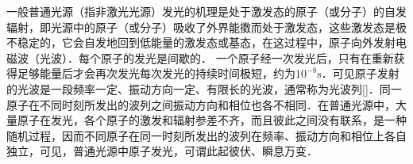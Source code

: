 
一般普通光源（指非激光光源）发光的机理是处于激发态的原子（或分子）的自发辐射，即光源中的原子（或分子）吸收了外界能擞而处于激发态，这些激发态是极不稳定的，它会自发地回到低能量的激发态或基态，在这过程中，原子向外发射电磁波（光波）．每个原子的发光是间歇的． 一个原子经一次发光后，只有在重新获得足够能量后才会再次发光每次发光的持续时间极短，约为$10^{-8}\mathrm s$．可见原子发射的光波是一段频率一定、振动方向一定、有限长的光波，通常称为光波列\autoref{}．同一原子在不同时刻所发出的波列之间振动方向和相位也各不相同．在普通光源中，大量原子在发光，各个原子的激发和辐射参差不齐，而且彼此之间没有联系，是一种随机过程，因而不同原子在同一时刻所发出的波列在频率、振动方向和相位上各自独立，可见，普通光源中原子发光，可谓此起彼伏、瞬息万变．